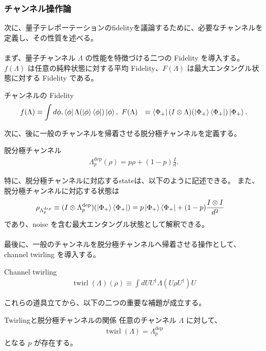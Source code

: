 \documentclass[a4paper,10.5pt]{article}
\numberwithin{equation}{section}
\begin{document}
\subsubsection{チャンネル操作論}
次に、量子テレポーテーションのfidelityを議論するために、必要なチャンネルを定義し、その性質を述べる。\\
\\
まず、量子チャンネル $\Lambda$ の性能を特徴づける二つの Fidelity を導入する。$f(\Lambda)$ は任意の純粋状態に対する平均 Fidelity、$F(\Lambda)$ は最大エンタングル状態に対する Fidelity である。
\begin{defbox}{チャンネルの Fidelity}
\begin{align*}
f(\Lambda)
&\equiv
\int d\phi,
\bra{\phi}
\Lambda(\ket{\phi}\bra{\phi})
\ket{\phi},\
F(\Lambda)
&\equiv
\bra{\Phi_+}
(I\otimes\Lambda)
(\ket{\Phi_+}\bra{\Phi_+})
\ket{\Phi_+}.
\end{align*}
\end{defbox}

次に、後に一般のチャンネルを帰着させる脱分極チャンネルを定義する。
\begin{defbox}{脱分極チャンネル}
\begin{align*}
\Lambda_p^{\mathrm{dep}}(\rho)
=p\rho+(1-p)\frac{I}{d}.
\end{align*}
\end{defbox}
特に、脱分極チャンネルに対応するstateは、以下のように記述できる。
また、脱分極チャンネルに対応する状態は
\begin{align*}
\rho_{\Lambda^{dep}_{p}}
&\equiv
(I\otimes\Lambda_p^{\mathrm{dep}})
(\ket{\Phi_+}\bra{\Phi_+})
=
p\ket{\Phi_+}\bra{\Phi_+}
+(1-p)\frac{I\otimes I}{d^2}
\end{align*}
であり、noise を含む最大エンタングル状態として解釈できる。\\
\\
最後に、一般のチャンネルを脱分極チャンネルへ帰着させる操作として、channel twirling を導入する。
\begin{defbox}{Channel twirling}
\begin{align*}
\operatorname{twirl}(\Lambda)(\rho)
\equiv
\int dU
U^\dagger
\Lambda(U\rho U^\dagger)
U 
\end{align*}
\end{defbox}
これらの道具立てから、以下の二つの重要な補題が成立する。
\begin{theorembox}{Twirlingと脱分極チャンネルの関係}
任意のチャンネル $\Lambda$ に対して、
\begin{align*}
    \operatorname{twirl}(\Lambda)
    =
    \Lambda_{p}^{\mathrm{dep}}
\end{align*}
となる $p$ が存在する。
\end{theorembox}
\end{document}
